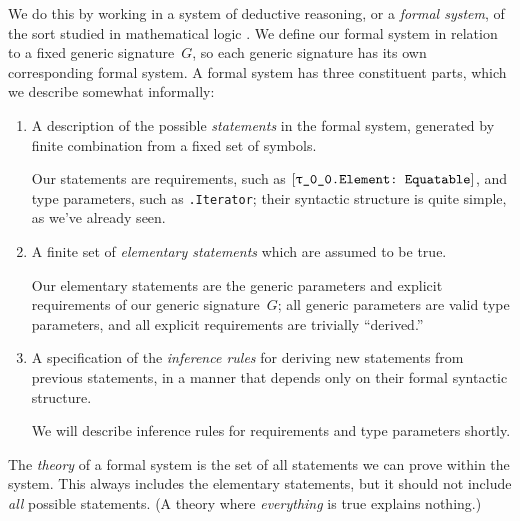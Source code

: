 \documentclass[../generics]{subfiles}
\begin{document}
We do this by working in a system of deductive reasoning, or a \emph{formal system}, of the sort studied in mathematical logic \cite{curry}. We define our formal system in relation to a fixed generic signature~$G$, so each generic signature has its own corresponding formal system. A formal system has three constituent parts, which we describe somewhat informally:
\begin{enumerate}
\item A description of the possible \emph{statements} in the formal system, generated by finite combination from a fixed set of symbols.

Our statements are requirements, such as $[\texttt{\texttt{$\uptau$\_0\_0}.Element:~Equatable}]$, and type parameters, such as \texttt{\rU.Iterator}; their syntactic structure is quite simple, as we've already seen.
\item A finite set of \emph{elementary statements} which are assumed to be true.

Our elementary statements are the generic parameters and explicit requirements of our generic signature~$G$; all generic parameters are valid type parameters, and all explicit requirements are trivially ``derived.''

\item A specification of the \emph{inference rules} for deriving new statements from previous statements, in a manner that depends only on their formal syntactic structure.

We will describe inference rules for requirements and type parameters shortly.
\end{enumerate}

The \emph{theory} of a formal system is the set of all statements we can prove within the system. This always includes the elementary statements, but it should not include \emph{all} possible statements. (A theory where \emph{everything} is true explains nothing.)
\end{document}
